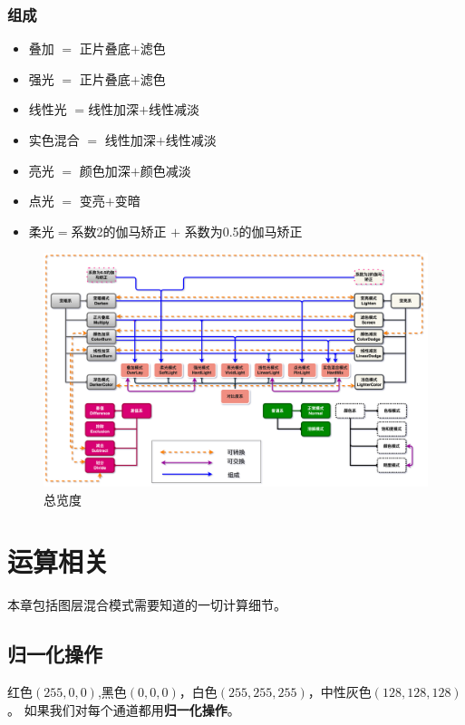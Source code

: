\subsection{ 组成}
\begin{itemize}
	\item 叠加 $=$ 正片叠底$+$滤色
	\item 强光 $=$ 正片叠底$+$滤色
	\item 线性光 $=$线性加深$+$线性减淡
	\item 实色混合 $=$ 线性加深$+$线性减淡
	\item 亮光 $=$ 颜色加深$+$颜色减淡
	\item 点光 $=$ 变亮$+$变暗
	\item 柔光$=$系数2的伽马矫正 $+$ 系数为0.5的伽马矫正
\end{itemize}
\begin{landscape}
	\begin{figure}[!htb]
		\centering
		\includegraphics[width=\linewidth]{figure/全体}
		\caption{总览度}
		\label{fig:all}
	\end{figure}
\end{landscape}
\chapter{运算相关}
\begin{introduction}
	\item 本章包括图层混合模式需要知道的一切计算细节。
\end{introduction}
\section{ 归一化操作} 红色$(255,0,0)$,黑色$(0,0,0)$，白色$(255,255,255)$，中性灰色$(128,128,128)$。\newline
 如果我们对每个通道都用\textbf{归一化操作}。
 
